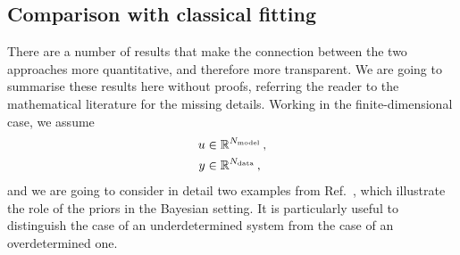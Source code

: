\subsection{Comparison with classical fitting}
\label{sec:comp-class-fit}

There are a number of results that make the connection between the two
approaches more quantitative, and therefore more transparent. We are
going to summarise these results here without proofs, referring the
reader to the mathematical literature for the missing details. Working
in the finite-dimensional case, we assume 
\begin{align*}
  u &\in \mathbb{R}^{N_{\rm model}} \, ,\\
  y &\in \mathbb{R}^{N_{\rm data}}\, ,
\end{align*}
and we are going to consider in detail two examples from Ref.~\cite{StuartCore},
which illustrate the role of the priors in the Bayesian setting. It is
particularly useful to distinguish the case of an underdetermined system from
the case of an overdetermined one. 

